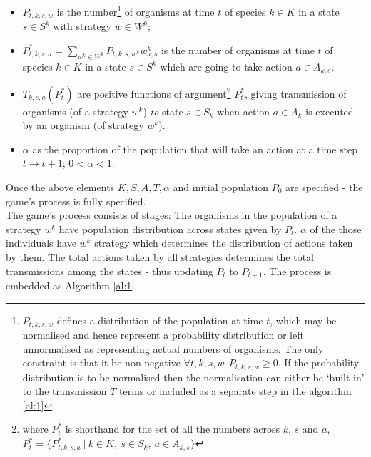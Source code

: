 \begin{itemize}[leftmargin=*,labelsep=4mm]
\item	$P_{t,k,s,w}$ is the number\footnote{$P_{t,k,s,w}$ defines a distribution of the population at time $t$, which may be normalised and hence represent a probability distribution or left unnormalised as representing actual numbers of organisms. The only constraint is that it be non-negative $\forall t,k,s,w~~P_{t,k,s,w}\ge 0$. If the probability distribution is to be normalised then the normalisation can either be `built-in' to the transmission $T$ terms or included as a separate step in the algorithm \ref{al:1}} of organisms at time $t$ of species $k\in K$ in a state $s\in S^k$ with strategy $w\in W^k$; 
\item   $P^*_{t,k,s,a} = \sum_{w^k\in W^k}P_{t,k,s,w^k}w^k_{a,s}$ is the number of organisms at time $t$ of species $k\in K$ in a state $s\in S^k$ which are going to take action $a\in A_{k,s}$.
\item   $T_{k,s,a}(P^*_t)$ are positive functions of argument\footnote{where $P^*_t$ is shorthand for the set of all the numbers across $k$, $s$ and $a$,  $P^*_t = \{P^*_{t,k,s,a}~|~k\in K,~s\in S_k,~a\in A_{k,s}\}$} $P^*_t$, giving transmission of organisms (of a strategy $w^k$) \textit{to} state $s\in S_k$ when action $a\in A_k$ is executed by an organism (of strategy $w^k$).
\item   $\alpha$ as the proportion of the population that will take an action at a time step $t\rightarrow t+1$; $0<\alpha<1$.
\end{itemize}

Once the above elements $K,S,A,T,\alpha$ and initial population $P_0$ are specified - the game's process is fully specified.\\
The game's process consists of stages: The organisms in the population of a strategy $w^k$ have population distribution across states given by $P_t$.  $\alpha$ of the those individuals have $w^k$ strategy which determines the distribution of actions taken by them.  The total actions taken by all strategies determines the total transmissions among the states - thus updating $P_t$ to $P_{t+1}$. The process is embedded as Algorithm \ref{al:1}.

